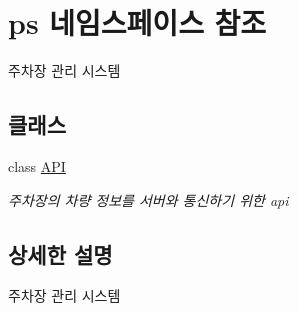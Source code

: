 \hypertarget{namespaceps}{}\section{ps 네임스페이스 참조}
\label{namespaceps}


주차장 관리 시스템  


\subsection*{클래스}
\begin{DoxyCompactItemize}
\item 
class \hyperlink{classps_1_1_a_p_i}{A\+PI}
\begin{DoxyCompactList}\small\item\em 주차장의 차량 정보를 서버와 통신하기 위한 api \end{DoxyCompactList}\end{DoxyCompactItemize}


\subsection{상세한 설명}
주차장 관리 시스템 